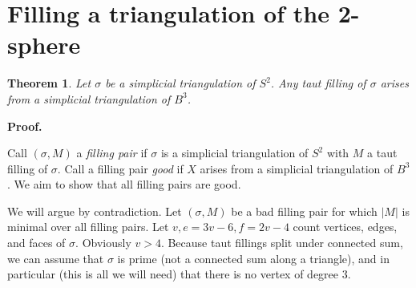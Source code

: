 \documentclass[12pt]{article}
\newtheorem{theorem}{Theorem}
\newcommand{\proofstart}{{\noindent \bf Proof.\ }}
\def\del{\partial}
\newcommand{\kw}{\mathrm}
\newcommand{\link}{\kw{link}}
\begin{document}

\section{Filling a triangulation of the 2-sphere}

\begin{theorem} \label{th2}
Let $\sigma$ be a simplicial triangulation of $S^2$.
Any taut filling of $\sigma$ arises from a simplicial triangulation of $B^3$.
\end{theorem}

\proofstart

Call $(\sigma,M)$ a \emph{filling pair} if $\sigma$ is a simplicial triangulation
of $S^2$ with $M$ a taut filling of $\sigma$.
Call a filling pair \emph{good}
if $X$ arises from a simplicial triangulation of $B^3$.
We aim to show that all filling pairs are good.

We will argue by contradiction.
Let $(\sigma,M)$ be a bad filling pair for which
$|M|$ is minimal over all filling pairs.
Let $v,e=3v-6,f=2v-4$ count vertices, edges, and faces of $\sigma$.
Obviously $v>4$.
Because taut fillings split under connected sum,
we can assume that $\sigma$ is prime
(not a connected sum along a triangle),
and in particular (this is all we will need) that there is no
vertex of degree $3$.
\end{document}
